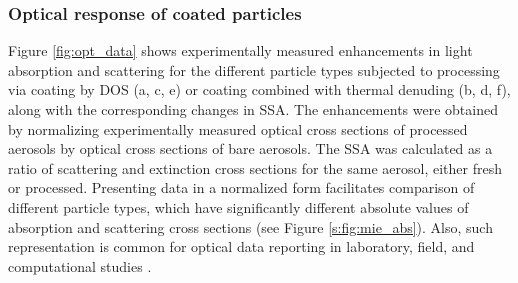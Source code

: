 \subsubsection{Optical response of coated particles}

Figure \ref{fig:opt_data} shows experimentally measured enhancements in light absorption and scattering for the different particle types subjected to processing via coating by DOS (a, c, e) or coating combined with thermal denuding (b, d, f), along with the corresponding changes in SSA. The enhancements were obtained by normalizing experimentally measured optical cross sections of processed aerosols by optical cross sections of bare aerosols. The SSA was calculated as a ratio of scattering and extinction cross sections for the same aerosol, either fresh or processed. Presenting data in a normalized form facilitates comparison of different particle types, which have significantly different absolute values of absorption and scattering cross sections (see Figure \ref{s:fig:mie_abs}). Also, such representation is common for optical data reporting in laboratory, field, and computational studies \citep{RN7,RN52,RN22}.

